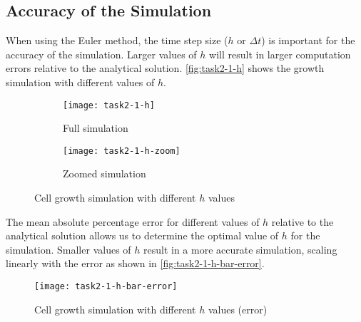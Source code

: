 \clearpage

\subsection{Accuracy of the Simulation}


When using the Euler method, the time step size ($h$ or $\Delta t$) is important for the accuracy of the simulation.
Larger values of $h$ will result in larger computation errors relative to the analytical solution.
\autoref{fig:task2-1-h} shows the growth  simulation with different values of $h$.

\begin{figure}[ht]
    \centering
    \begin{subfigure}{\textwidth}
        \centering
        \texttt{[image: task2-1-h]}
        \caption[Full simulation]{Full simulation}
        \label{fig:task2-1-h-full}
    \end{subfigure}

    \begin{subfigure}{\textwidth}
        \centering
        \texttt{[image: task2-1-h-zoom]}
        \caption[Zoomed simulation]{Zoomed simulation}
        \label{fig:task2-1-h-zoom}
    \end{subfigure}
    \caption[Cell growth simulation with different $h$ values]{Cell growth simulation with different $h$ values}
    \label{fig:task2-1-h}
\end{figure}

The mean absolute percentage error for different values of $h$ relative to the analytical solution allows us to determine the optimal value of $h$ for the simulation.
Smaller values of $h$ result in a more accurate simulation, scaling linearly with the error as shown in \autoref{fig:task2-1-h-bar-error}.

\begin{figure}[!ht]
    \centering
    \texttt{[image: task2-1-h-bar-error]}
    \caption[Cell growth simulation with different $h$ values (error)]{Cell growth simulation with different $h$ values (error)}
    \label{fig:task2-1-h-bar-error}
\end{figure}



